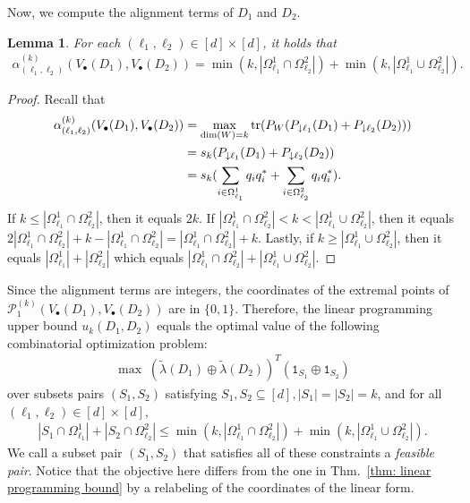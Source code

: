 \documentclass[12pt]{article}
\newtheorem{lem}[thm]{Lemma}
\theoremstyle{definition}
\numberwithin{equation}{section}
\numberwithin{equation}{section}
\newcommand{\al}{\alpha}
\newcommand{\la}{\lambda}
\newcommand{\one}{\mathtt{1}}
\newcommand{\da}{\downarrow}
\newcommand{\Og}{\Omega}
\newcommand{\cP}{\mathcal{P}}
\begin{document}
Now, we compute the alignment terms of \(D_1\) and \(D_2\).
\begin{lem}
\label{lem: explicit form for alignment terms}
For each \( (\ell_1, \ell_2) \in [d] \times [d]\), it holds that
\begin{gather}
\al_{(\ell_1, \ell_2)}^{(k)} (V_{
\bullet} (D_1), V_{\bullet} (D_2))
= \min(k, | \Og^{1}_{\ell_1} \cap \Og^{2}_{\ell_2} |) + \min(k, |\Og^{1}_{\ell_1} \cup \Og^{2}_{\ell_2}|).
\end{gather}
\end{lem}
\begin{proof}
Recall that 
\begin{align}
 \al_{(\ell_1, \ell_2)}^{(k)} (V_{\bullet} (D_1), V_{\bullet} (D_2)) &= \max_{\dim(W) =k} \tr (P_W ( P_{\da \ell_1} (D_1) + P_{\da \ell_2} (D_2)))\\
 &= s_k( P_{\da \ell_1} (D_1) + P_{\da \ell_2} (D_2)) \\
 &= s_k( \sum_{i \in \Og^1_{\ell_1}} q_i q_i^* + \sum_{i \in \Og^2_{\ell_2}} q_i q_i^*). 
\end{align}
If \(k \leq |\Og^{1}_{\ell_1} \cap \Og^{2}_{\ell_2}|\), then it equals \(2k\). If \(|\Og^{1}_{\ell_1} \cap \Og^{2}_{\ell_2}| < k < |\Og^{1}_{\ell_1} \cup \Og^{2}_{\ell_2}|\), then it equals \( 2 |\Og^{1}_{\ell_1} \cap \Og^{2}_{\ell_2}| + k - |\Og^{1}_{\ell_1} \cap \Og^{2}_{\ell_2}| = |\Og^{1}_{\ell_1} \cap \Og^{2}_{\ell_2}| + k\). Lastly, if \(k \geq |\Og^{1}_{\ell_1} \cup \Og^{2}_{\ell_2}|\), then it equals \(|\Og^{1}_{\ell_1}| + |\Og^2_{\ell_2}|\) which equals \( |\Og^{1}_{\ell_1} \cap \Og^{2}_{\ell_2}| + |\Og^{1}_{\ell_1} \cup \Og^{2}_{\ell_2}|\). \end{proof}



Since the alignment terms are integers, the coordinates of the extremal points of \(\cP_1^{(k)} (V_{\bullet} (D_1), V_{\bullet} (D_2))\) are in \(\{0,1\}\). Therefore, the linear programming upper bound \(u_k (D_1, D_2)\) equals the optimal value of the following combinatorial optimization problem:
\begin{align}
\label{eq: obj comb}
\max \; (\tilde{\la} (D_1) \oplus \tilde{\la}(D_2))^T (\one_{S_1} \oplus \one_{S_2})
\end{align}
over subsets pairs \((S_1, S_2)\) satisfying \(S_1, S_2 \subseteq [d], |S_1| = |S_2| = k\), and for all \((\ell_1, \ell_2) \in [d] \times [d]\),
\begin{align}
\label{eq: comb align cons}
|S_1 \cap \Og^1_{\ell_1}| + |S_2 \cap \Og^2_{\ell_2}| \leq \min(k, | \Og^{1}_{\ell_1} \cap \Og^{2}_{\ell_2} |) + \min(k, |\Og^{1}_{\ell_1} \cup \Og^{2}_{\ell_2}|).
\end{align}
We call a subset pair \((S_1, S_2)\) that satisfies all of these constraints a \textit{feasible pair}. Notice that the objective here differs from the one in Thm.~\ref{thm: linear programming bound} by a relabeling of the coordinates of the linear form. 
\end{document}
